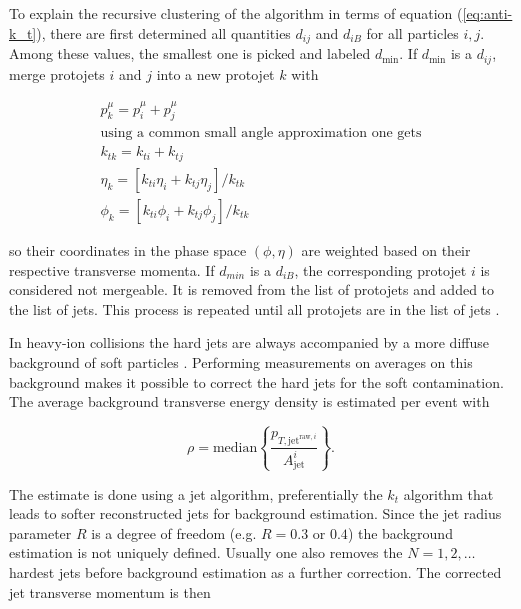 \documentclass[
  a4paper,
  12pt,
  oneside,
  parskip=half,
  listof=totoc,
  bibliography=totoc,
  DIV=12,
  numbers=noenddot,
  BA.tex
  ]{subfiles}
\begin{document}
To explain the recursive clustering of the algorithm in terms of equation (\ref{eq:anti-k_t}), there are first determined all quantities $d_{ij}$ and $d_{iB}$ for all particles $i,j$. Among these values, the smallest one is picked and labeled $d_\text{min}$. If $d_\text{min}$ is a $d_{ij}$, merge protojets $i$ and $j$ into a new protojet $k$ with

\begin{equation}
	\begin{gathered}
		p_k^\mu = p_i^\mu + p_j^\mu \\
		\text{using a common small angle approximation one gets}\\	
		k_{tk} = k_{ti} + k_{tj} \\
		\eta_k = \left[k_{ti} \eta_i + k_{tj} \eta_j \right] / k_{tk} \\
		\phi_k = \left[k_{ti} \phi_i + k_{tj} \phi_j \right] / k_{tk} 
	\end{gathered}
\end{equation}

so their coordinates in the phase space $(\phi, \eta)$ are weighted based on their respective transverse momenta. If $d_{min}$ is a $d_{iB}$, the corresponding protojet $i$ is considered not mergeable. It is removed from the list of protojets and added to the list of jets. This process is repeated until all protojets are in the list of jets \cite{ellis_successive_1993}.

In heavy-ion collisions the hard jets are always accompanied by a more diffuse background of soft particles \cite{cacciari_fastjet_2012}. Performing measurements on averages on this background makes it possible to correct the hard jets for the soft contamination. The average background transverse energy density is estimated per event with

\begin{equation}
	\rho = \text{median}\left\{\frac{p_{T,\text{jet}^{\text{raw},i}}}{A_\text{jet}^i}\right\}.
\end{equation}

The estimate is done using a jet algorithm, preferentially the $k_t$ algorithm that leads to softer reconstructed jets \cite{cacciari_fastjet_2012} for background estimation. Since the jet radius parameter $R$ is a degree of freedom (e.g. $R = 0.3 \text{ or } 0.4$) the background estimation is not uniquely defined. Usually one also removes the  $N=1,2,\dots$ hardest jets before background estimation as a further correction. The corrected jet transverse momentum is then
\end{document}
